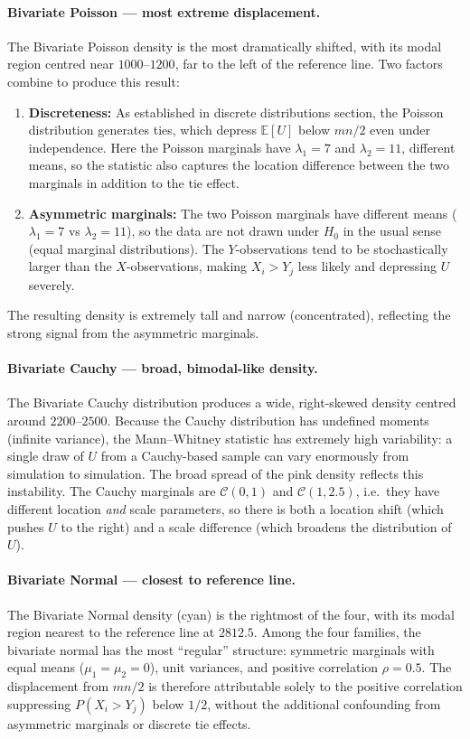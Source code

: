 \documentclass[10pt]{article}
\begin{document}
\paragraph{Bivariate Poisson --- most extreme displacement.}
The Bivariate Poisson density is the most dramatically shifted,
with its modal region centred near $1000$--$1200$, far to the left
of the reference line.  Two factors combine to produce this result:
\begin{enumerate}[noitemsep, label=(\alph*)]
  \item \textbf{Discreteness:}  As established in
        discrete distributions section, the Poisson distribution generates
        ties, which depress $\mathbb{E}[U]$ below $mn/2$ even under
        independence.  Here the Poisson marginals have
        $\lambda_1 = 7$ and $\lambda_2 = 11$, different means, so
        the statistic also captures the location difference between
        the two marginals in addition to the tie effect.
  \item \textbf{Asymmetric marginals:}  The two Poisson marginals
        have different means ($\lambda_1 = 7$ vs $\lambda_2 = 11$),
        so the data are not drawn under $H_0$ in the usual sense
        (equal marginal distributions).  The $Y$-observations tend
        to be stochastically larger than the $X$-observations,
        making $X_i > Y_j$ less likely and depressing $U$ severely.
\end{enumerate}
The resulting density is extremely tall and narrow (concentrated),
reflecting the strong signal from the asymmetric marginals.

\paragraph{Bivariate Cauchy --- broad, bimodal-like density.}
The Bivariate Cauchy distribution produces a wide, right-skewed
density centred around $2200$--$2500$.  Because the Cauchy
distribution has undefined moments (infinite variance), the
Mann--Whitney statistic has extremely high variability: a single
draw of $U$ from a Cauchy-based sample can vary enormously from
simulation to simulation.  The broad spread of the pink density
reflects this instability.  The Cauchy marginals are
$\mathcal{C}(0,1)$ and $\mathcal{C}(1,2.5)$, i.e.\ they have
different location \emph{and} scale parameters, so there is both
a location shift (which pushes $U$ to the right) and a scale
difference (which broadens the distribution of $U$).

\paragraph{Bivariate Normal --- closest to reference line.}
The Bivariate Normal density (cyan) is the rightmost of the four,
with its modal region nearest to the reference line at $2812.5$.
Among the four families, the bivariate normal has the most
``regular'' structure: symmetric marginals with equal means
($\mu_1 = \mu_2 = 0$), unit variances, and positive correlation
$\rho = 0.5$.  The displacement from $mn/2$ is therefore
attributable solely to the positive correlation suppressing
$P(X_i > Y_j)$ below $1/2$, without the additional confounding
from asymmetric marginals or discrete tie effects.
\end{document}
